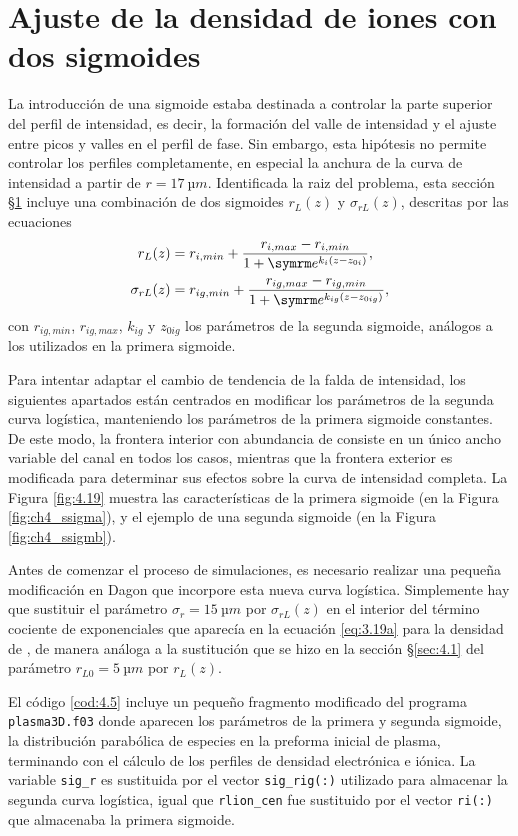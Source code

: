 \section{Ajuste de la densidad de iones con dos sigmoides}\label{sec:4.2}
La introducción de una sigmoide estaba destinada a controlar la parte superior del perfil de intensidad, es decir, la formación del valle de intensidad y el ajuste entre picos y valles en el perfil de fase. Sin embargo, esta hipótesis no permite controlar los perfiles completamente, en especial la anchura de la curva de intensidad a partir de $r=\qty{17}{µm}$. Identificada la raiz del problema, esta sección \S\ref{sec:4.2} incluye una combinación de dos sigmoides $r_{L}(z)$ y $\sigma_{rL}(z)$, descritas por las ecuaciones
\begin{align}
  \label{eq:4.1a}
  r_{L}(z) &= r_{i,min} + \frac{r_{i,max}-r_{i,min}}{1+\eu^{k_{i}(z-z_{0i})}}, \\
  \label{4.1b}
  \sigma_{rL}(z) &= r_{ig,min} + \frac{r_{ig,max}-r_{ig,min}}{1+\eu^{k_{ig}(z-z_{0ig})}},
\end{align}
con $r_{ig,min}$, $r_{ig,max}$, $k_{ig}$ y $z_{0ig}$ los parámetros de la segunda sigmoide, análogos a los utilizados en la primera sigmoide. 

Para intentar adaptar el cambio de tendencia de la falda de intensidad, los siguientes apartados están centrados en modificar los parámetros de la segunda curva logística, manteniendo los parámetros de la primera sigmoide constantes. De este modo, la frontera interior con abundancia de  consiste en un único ancho variable del canal en todos los casos, mientras que la frontera exterior es modificada para determinar sus efectos sobre la curva de intensidad completa. La Figura \ref{fig:4.19} muestra las características de la primera sigmoide (en la Figura \ref{fig:ch4_ssigma}), y el ejemplo de una segunda sigmoide (en la Figura \ref{fig:ch4_ssigmb}).

Antes de comenzar el proceso de simulaciones, es necesario realizar una pequeña modificación en Dagon que incorpore esta nueva curva logística. Simplemente hay que sustituir el parámetro $\sigma_{r}=\qty{15}{µm}$ por $\sigma_{rL}(z)$ en el interior del término cociente de exponenciales que aparecía en la ecuación \eqref{eq:3.19a} para la densidad de , de manera análoga a la sustitución que se hizo en la sección \S\ref{sec:4.1} del parámetro $r_{L0}=\qty{5}{µm}$ por $r_{L}(z)$. 

El código \ref{cod:4.5} incluye un pequeño fragmento modificado del programa \texttt{plasma3D.f03} donde aparecen los parámetros de la primera y segunda sigmoide, la distribución parabólica de especies en la preforma inicial de plasma, terminando con el cálculo de los perfiles de densidad electrónica e iónica. La variable \texttt{sig\_r} es sustituida por el vector \texttt{sig\_rig(:)} utilizado para almacenar la segunda curva logística, igual que \texttt{rlion\_cen} fue sustituido por el vector \texttt{ri(:)} que almacenaba la primera sigmoide.

